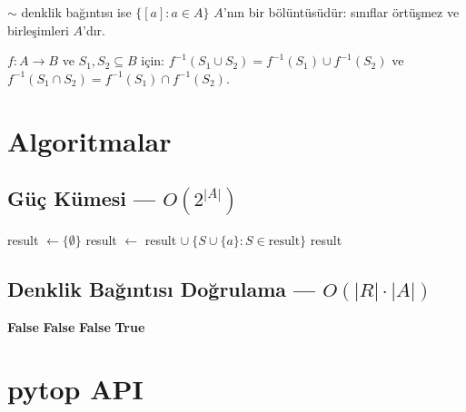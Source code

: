 \begin{theorem}
$\sim$ denklik bağıntısı ise $\{[a] : a \in A\}$ $A$'nın bir bölüntüsüdür:
sınıflar örtüşmez ve birleşimleri $A$'dır.
\end{theorem}

\begin{theorem}
$f: A \to B$ ve $S_1, S_2 \subseteq B$ için:
$f^{-1}(S_1 \cup S_2) = f^{-1}(S_1) \cup f^{-1}(S_2)$ ve
$f^{-1}(S_1 \cap S_2) = f^{-1}(S_1) \cap f^{-1}(S_2)$.
\end{theorem}

\section{Algoritmalar}

\subsection{Güç Kümesi — $O(2^{|A|})$}

\begin{algorithm}
\caption{PowerSet$(A)$}
\begin{algorithmic}[1]
\State result $\leftarrow \{\emptyset\}$
    \State result $\leftarrow$ result $\cup\ \{S \cup \{a\} : S \in \text{result}\}$
\EndFor
\State \Return result
\end{algorithmic}
\end{algorithm}

\subsection{Denklik Bağıntısı Doğrulama — $O(|R| \cdot |A|)$}

\begin{algorithm}
\caption{IsEquivalence$(A, R)$}
\begin{algorithmic}[1]
     \Return \textbf{False} \EndIf
\EndFor
{}
     \Return \textbf{False} \EndIf
\EndFor
{}
     \Return \textbf{False} \EndIf
\EndFor
\State \Return \textbf{True}
\end{algorithmic}
\end{algorithm}

\section{pytop API}

